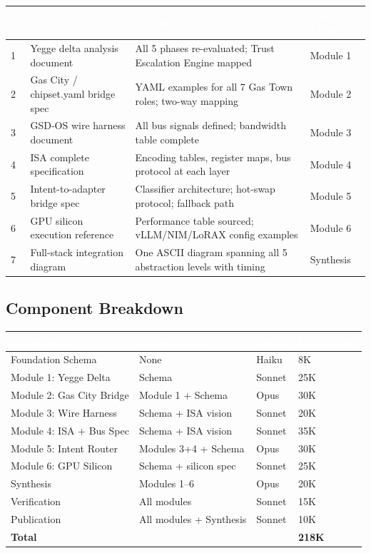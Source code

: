 \documentclass[11pt,letterpaper]{article}
\newcommand{\tableheader}[1]{\textbf{\sffamily\textcolor{white}{#1}}}
\begin{document}
\begin{center}
\begin{tabularx}{\textwidth}{C{0.5cm}L{4cm}L{5cm}X}
\toprule
{}
\tableheader{\#} & \tableheader{Deliverable} & \tableheader{Acceptance Criteria} & \tableheader{Spec Module} \\
 & Yegge delta analysis document & All 5 phases re-evaluated; Trust Escalation Engine mapped & Module 1 \\
2 & Gas City / chipset.yaml bridge spec & YAML examples for all 7 Gas Town roles; two-way mapping & Module 2 \\
3 & GSD-OS wire harness document & All bus signals defined; bandwidth table complete & Module 3 \\
4 & ISA complete specification & Encoding tables, register maps, bus protocol at each layer & Module 4 \\
5 & Intent-to-adapter bridge spec & Classifier architecture; hot-swap protocol; fallback path & Module 5 \\
6 & GPU silicon execution reference & Performance table sourced; vLLM/NIM/LoRAX config examples & Module 6 \\
7 & Full-stack integration diagram & One ASCII diagram spanning all 5 abstraction levels with timing & Synthesis \\
\bottomrule
\end{tabularx}
\end{center}

\subsection{Component Breakdown}

\begin{center}
\begin{tabularx}{\textwidth}{L{3.5cm}L{3cm}C{2cm}C{2cm}}
\toprule
{}
\tableheader{Component} & \tableheader{Dependencies} & \tableheader{Model} & \tableheader{Est. Tokens} \\
\midrule
Foundation Schema & None & Haiku & 8K \\
Module 1: Yegge Delta & Schema & Sonnet & 25K \\
Module 2: Gas City Bridge & Module 1 + Schema & Opus & 30K \\
Module 3: Wire Harness & Schema + ISA vision & Sonnet & 20K \\
Module 4: ISA + Bus Spec & Schema + ISA vision & Sonnet & 35K \\
Module 5: Intent Router & Modules 3+4 + Schema & Opus & 30K \\
Module 6: GPU Silicon & Schema + silicon spec & Sonnet & 25K \\
Synthesis & Modules 1--6 & Opus & 20K \\
Verification & All modules & Sonnet & 15K \\
Publication & All modules + Synthesis & Sonnet & 10K \\
\midrule
\textbf{Total} & & & \textbf{218K} \\
\bottomrule
\end{tabularx}
\end{center}
\end{document}
